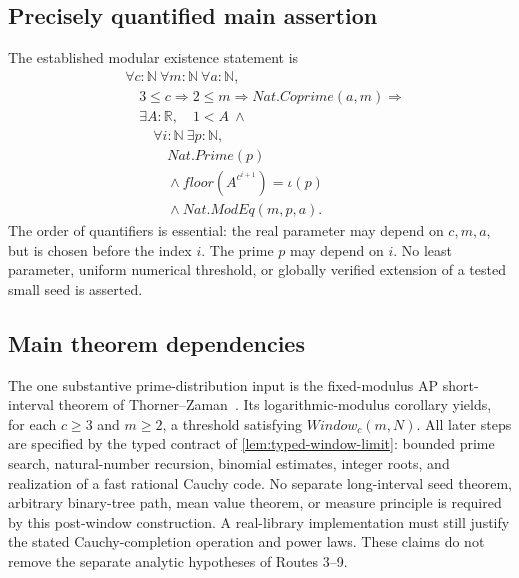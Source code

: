 \documentclass[11pt,reqno]{amsart}
\makeatletter
\newcommand{\N}{\mathbb N}
\newcommand{\R}{\mathbb R}
\theoremstyle{blueplain}
\newcounter{type}
\newcounter{asser}
\newcommand{\defref}[1]{\hyperref[#1]{Definition~\ref*{#1}}}
\numberwithin{equation}{section}
\DeclareRobustCommand{\defref}[1]{%
  \hyperlink{def:#1}{\ensuremath{\csname PredicateName@#1\endcsname}}}
\def\defref#1{#1}%
\def\hyperlink#1#2{#2}}
\makeatother
\begin{document}
\subsection{Precisely quantified main assertion}
The established modular existence statement is
\[
\begin{aligned}
&\forall c:\N\ \forall m:\N\ \forall a:\N,\\
&\quad3\le c\Rightarrow2\le m\Rightarrow\defref{Nat.Coprime}(a,m)\Rightarrow\\
&\quad\exists A:\R,\quad1<A\ \wedge\\
&\qquad\forall i:\N\ \exists p:\N,\\
&\qquad\quad\defref{Nat.Prime}(p)\\
&\qquad\quad{}\wedge\defref{floor}(A^{c^{i+1}})=\iota(p)\\
&\qquad\quad{}\wedge\defref{Nat.ModEq}(m,p,a).
\end{aligned}
\]
The order of quantifiers is essential: the real parameter may depend on
$c,m,a$, but is chosen before the index $i$. The prime $p$ may depend on
$i$. No least parameter, uniform numerical threshold, or globally verified
extension of a tested small seed is asserted.

\subsection{Main theorem dependencies}
The one substantive prime-distribution input is the fixed-modulus \hyperlink{term:AP}{AP}
short-interval theorem of Thorner--Zaman~\cite{ThornerZaman2024}.
Its logarithmic-modulus corollary yields, for each $c\ge3$ and $m\ge2$,
a threshold satisfying $\defref{Window}_c(m,N)$.
All later steps are specified by the typed contract of
\cref{lem:typed-window-limit}: bounded prime search, natural-number
recursion, binomial estimates, integer roots, and realization of a fast
rational Cauchy code. No separate long-interval seed theorem, arbitrary
binary-tree path, mean value theorem, or measure principle is required
by this post-window construction. A real-library implementation must
still justify the stated Cauchy-completion operation and power laws.
These claims do not remove the separate analytic hypotheses of Routes 3--9.
\end{document}
